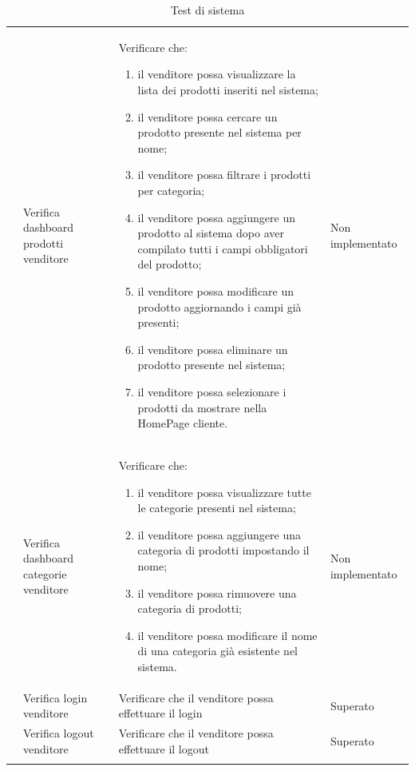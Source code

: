 \begin{center}
\begin{longtable}{|p{0.85cm}|p{2.25cm}|p{9cm}|p{3cm}|}
		 & Verifica dashboard prodotti venditore & Verificare che:
		\begin{enumerate}
			\item il venditore possa visualizzare la lista dei prodotti inseriti nel sistema;
			\item il venditore possa cercare un prodotto presente nel sistema per nome;
			\item il venditore possa filtrare i prodotti per categoria;
			\item il venditore possa aggiungere un prodotto al sistema dopo aver compilato tutti i campi obbligatori del prodotto;
			\item il venditore possa modificare un prodotto aggiornando i campi già presenti;
			\item il venditore possa eliminare un prodotto presente nel sistema;
			\item il venditore possa selezionare i prodotti da mostrare nella HomePage cliente.
		\end{enumerate} & Non implementato\\

		 & Verifica dashboard categorie venditore & Verificare che:
		\begin{enumerate}
			\item il venditore possa visualizzare tutte le categorie presenti nel sistema;
			\item il venditore possa aggiungere una categoria di prodotti impostando il nome;
			\item il venditore possa rimuovere una categoria di prodotti;
			\item il venditore possa modificare il nome di una categoria già esistente nel sistema.
		\end{enumerate} & Non implementato\\

		 & Verifica login venditore & Verificare che il venditore possa effettuare il login & Superato \\

		 & Verifica logout venditore & Verificare che il venditore possa effettuare il logout & Superato\\

		\hline
		\caption{Test di sistema}
	\end{longtable}
\end{center}



